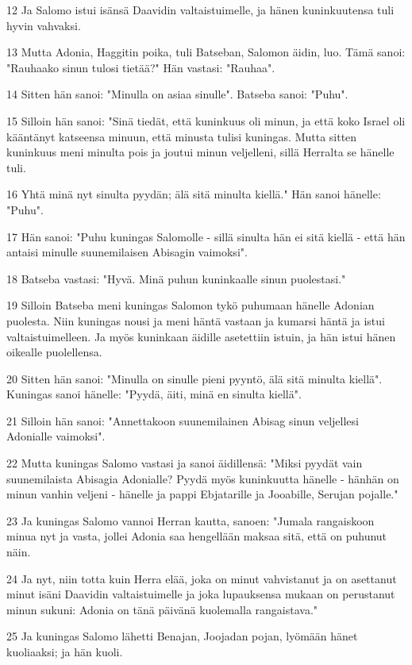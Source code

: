 \par 12 Ja Salomo istui isänsä Daavidin valtaistuimelle, ja hänen kuninkuutensa tuli hyvin vahvaksi.
\par 13 Mutta Adonia, Haggitin poika, tuli Batseban, Salomon äidin, luo. Tämä sanoi: "Rauhaako sinun tulosi tietää?" Hän vastasi: "Rauhaa".
\par 14 Sitten hän sanoi: "Minulla on asiaa sinulle". Batseba sanoi: "Puhu".
\par 15 Silloin hän sanoi: "Sinä tiedät, että kuninkuus oli minun, ja että koko Israel oli kääntänyt katseensa minuun, että minusta tulisi kuningas. Mutta sitten kuninkuus meni minulta pois ja joutui minun veljelleni, sillä Herralta se hänelle tuli.
\par 16 Yhtä minä nyt sinulta pyydän; älä sitä minulta kiellä." Hän sanoi hänelle: "Puhu".
\par 17 Hän sanoi: "Puhu kuningas Salomolle - sillä sinulta hän ei sitä kiellä - että hän antaisi minulle suunemilaisen Abisagin vaimoksi".
\par 18 Batseba vastasi: "Hyvä. Minä puhun kuninkaalle sinun puolestasi."
\par 19 Silloin Batseba meni kuningas Salomon tykö puhumaan hänelle Adonian puolesta. Niin kuningas nousi ja meni häntä vastaan ja kumarsi häntä ja istui valtaistuimelleen. Ja myös kuninkaan äidille asetettiin istuin, ja hän istui hänen oikealle puolellensa.
\par 20 Sitten hän sanoi: "Minulla on sinulle pieni pyyntö, älä sitä minulta kiellä". Kuningas sanoi hänelle: "Pyydä, äiti, minä en sinulta kiellä".
\par 21 Silloin hän sanoi: "Annettakoon suunemilainen Abisag sinun veljellesi Adonialle vaimoksi".
\par 22 Mutta kuningas Salomo vastasi ja sanoi äidillensä: "Miksi pyydät vain suunemilaista Abisagia Adonialle? Pyydä myös kuninkuutta hänelle - hänhän on minun vanhin veljeni - hänelle ja pappi Ebjatarille ja Jooabille, Serujan pojalle."
\par 23 Ja kuningas Salomo vannoi Herran kautta, sanoen: "Jumala rangaiskoon minua nyt ja vasta, jollei Adonia saa hengellään maksaa sitä, että on puhunut näin.
\par 24 Ja nyt, niin totta kuin Herra elää, joka on minut vahvistanut ja on asettanut minut isäni Daavidin valtaistuimelle ja joka lupauksensa mukaan on perustanut minun sukuni: Adonia on tänä päivänä kuolemalla rangaistava."
\par 25 Ja kuningas Salomo lähetti Benajan, Joojadan pojan, lyömään hänet kuoliaaksi; ja hän kuoli.
